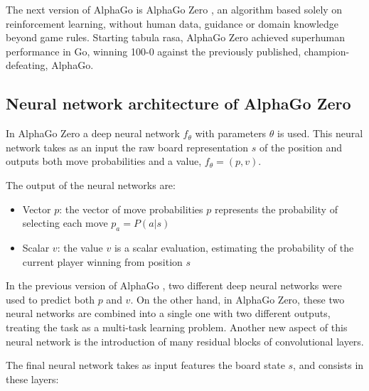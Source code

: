 \documentclass{article}
\begin{document}
The next version of AlphaGo is AlphaGo Zero \cite{silver2017mastering}, an algorithm based solely on reinforcement learning, without human data, guidance or domain knowledge beyond game rules. Starting tabula rasa, AlphaGo Zero achieved superhuman performance in Go, winning 100-0 against the previously published, champion-defeating, AlphaGo.

\subsection{Neural network architecture  of AlphaGo Zero} \label{nn-arch}
In AlphaGo Zero a deep neural network $f_\theta$ with parameters $\theta$ is used. This neural network takes as an input the raw board representation $s$ of the position and outputs both move probabilities and a value, $f_\theta = (p,v)$. 

The output of the neural networks are:
\begin{itemize}
	\item Vector $p$: the vector of move probabilities $p$ represents the probability of selecting each move $p_a = P(a | s)$
	\item Scalar $v$: the value $v$ is a scalar evaluation, estimating the probability of the current player winning from position $s$
\end{itemize}
In the previous version of AlphaGo \cite{Silver_2016}, two different deep neural networks were used to predict both $p$ and $v$. On the other hand, in AlphaGo Zero, these two neural networks are combined into a single one with two different outputs, treating the task as a multi-task learning problem. Another new aspect of this neural network is the introduction of many residual blocks of convolutional layers.

The final neural network takes as input features the board state $s$,  and consists in these layers:
\end{document}
